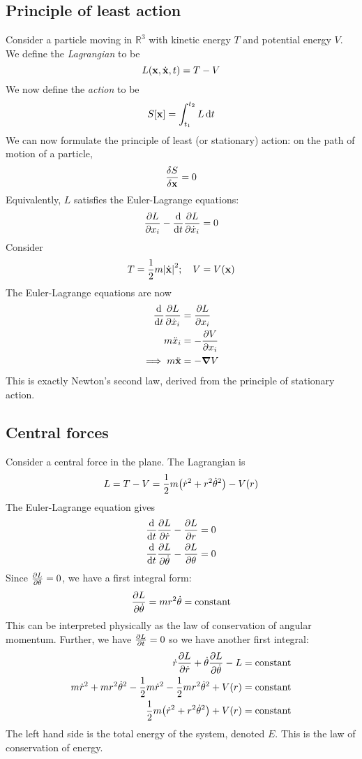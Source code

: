 \subsection{Principle of least action}
Consider a particle moving in \( \mathbb R^3 \) with kinetic energy \( T \) and potential energy \( V \).
We define the \textit{Lagrangian} to be
\[
	L(\vb x, \dot {\vb x}, t) = T - V
\]
We now define the \textit{action} to be
\[
	S[\vb x] = \int_{t_1}^{t_2} L \dd{t}
\]
We can now formulate the principle of least (or stationary) action: on the path of motion of a particle,
\[
	\fdv{S}{\vb x} = 0
\]
Equivalently, \( L \) satisfies the Euler-Lagrange equations:
\[
	\pdv{L}{x_i} - \dv{t}\pdv{L}{\dot x_i} = 0
\]
Consider
\[
	T = \frac{1}{2}m\abs{\dot{\vb x}}^2;\quad V = V(\vb x)
\]
The Euler-Lagrange equations are now
\begin{align*}
	\dv{t}\pdv{L}{\dot x_i} & = \pdv{L}{x_i}  \\
	m \ddot x_i             & = -\pdv{V}{x_i} \\
	\implies m \ddot{\vb x} & = -\grad V
\end{align*}
This is exactly Newton's second law, derived from the principle of stationary action.

\subsection{Central forces}
\begin{example}
	Consider a central force in the plane.
	The Lagrangian is
	\[
		L = T - V = \frac{1}{2}m\qty(\dot r^2 + r^2 \dot \theta^2) - V(r)
	\]
	The Euler-Lagrange equation gives
	\begin{align*}
		\dv{t}\pdv{L}{\dot r} - \pdv{L}{r}           & = 0 \\
		\dv{t}\pdv{L}{\dot \theta} - \pdv{L}{\theta} & = 0
	\end{align*}
	Since \( \pdv{L}{\theta} = 0 \), we have a first integral form:
	\[
		\pdv{L}{\dot \theta} = mr^2 \dot \theta = \text{constant}
	\]
	This can be interpreted physically as the law of conservation of angular momentum.
	Further, we have \( \pdv{L}{t} = 0 \) so we have another first integral:
	\begin{align*}
		\dot r \pdv{L}{\dot r} + \dot\theta \pdv{L}{\dot\theta} - L                              & = \text{constant} \\
		m\dot r^2 + mr^2\dot\theta^2 - \frac{1}{2}m\dot r^2 - \frac{1}{2}mr^2\dot\theta^2 + V(r) & = \text{constant} \\
		\frac{1}{2} m \qty( \dot r^2 + r^2\dot\theta^2 ) + V(r)                                  & = \text{constant}
	\end{align*}
	The left hand side is the total energy of the system, denoted \( E \).
	This is the law of conservation of energy.
\end{example}

